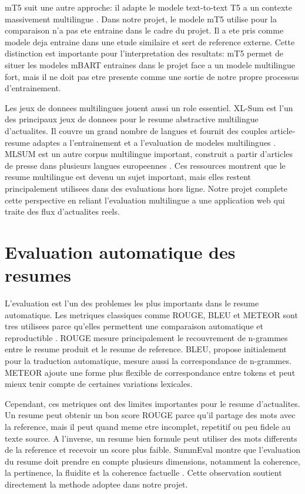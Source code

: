 mT5 suit une autre approche: il adapte le modele text-to-text T5 a un contexte massivement multilingue \cite{Xue2021mT5}. Dans notre projet, le modele mT5 utilise pour la comparaison n'a pas ete entraine dans le cadre du projet. Il a ete pris comme modele deja entraine dans une etude similaire et sert de reference externe. Cette distinction est importante pour l'interpretation des resultats: mT5 permet de situer les modeles mBART entraines dans le projet face a un modele multilingue fort, mais il ne doit pas etre presente comme une sortie de notre propre processus d'entrainement.

Les jeux de donnees multilingues jouent aussi un role essentiel. XL-Sum est l'un des principaux jeux de donnees pour le resume abstractive multilingue d'actualites. Il couvre un grand nombre de langues et fournit des couples article-resume adaptes a l'entrainement et a l'evaluation de modeles multilingues \cite{Hasan2021XLSum}. MLSUM est un autre corpus multilingue important, construit a partir d'articles de presse dans plusieurs langues europeennes \cite{Scialom2020MLSUM}. Ces ressources montrent que le resume multilingue est devenu un sujet important, mais elles restent principalement utilisees dans des evaluations hors ligne. Notre projet complete cette perspective en reliant l'evaluation multilingue a une application web qui traite des flux d'actualites reels.

\section{Evaluation automatique des resumes}

L'evaluation est l'un des problemes les plus importants dans le resume automatique. Les metriques classiques comme ROUGE, BLEU et METEOR sont tres utilisees parce qu'elles permettent une comparaison automatique et reproductible \cite{Lin2004ROUGE,Papineni2002BLEU,Banerjee2005METEOR}. ROUGE mesure principalement le recouvrement de n-grammes entre le resume produit et le resume de reference. BLEU, propose initialement pour la traduction automatique, mesure aussi la correspondance de n-grammes. METEOR ajoute une forme plus flexible de correspondance entre tokens et peut mieux tenir compte de certaines variations lexicales.

Cependant, ces metriques ont des limites importantes pour le resume d'actualites. Un resume peut obtenir un bon score ROUGE parce qu'il partage des mots avec la reference, mais il peut quand meme etre incomplet, repetitif ou peu fidele au texte source. A l'inverse, un resume bien formule peut utiliser des mots differents de la reference et recevoir un score plus faible. SummEval montre que l'evaluation du resume doit prendre en compte plusieurs dimensions, notamment la coherence, la pertinence, la fluidite et la coherence factuelle \cite{Fabbri2021SummEval}. Cette observation soutient directement la methode adoptee dans notre projet.

